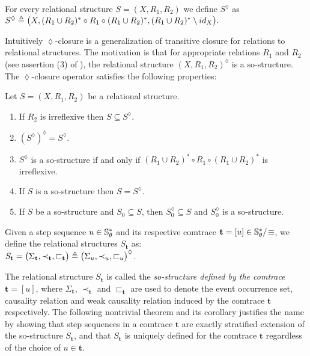 \documentclass{llncs}
\begin{document}
\begin{definition}[\cite{JK95}]
For every relational structure $S=(X,R_1,R_2)$ we define $S^\lozenge$ as\smallskip\\
\mbox{\hspace{2cm}}$S^\lozenge \triangleq \bigl(X,(R_1\cup R_2)^* \circ R_1 \circ (R_1\cup R_2)^*,(R_1\cup R_2)^* \setminus id_X\bigr).$ \EOD
\label{def:SO-CL}
\end{definition}


Intuitively $\lozenge$-closure is a generalization of transitive closure for relations to relational structures. The motivation is that for appropriate  relations $R_1$ and $R_2$ (see assertion (3) of ), the relational structure $(X,R_1,R_2)^\lozenge$ is a so-structure. The $\lozenge$-closure operator satisfies the following properties:

\begin{proposition}[\cite{JK95}]
Let $S=(X,R_1,R_2)$ be a relational structure.
\begin{enumerate}
\item If $R_2$ is irreflexive then $S\subseteq S^\lozenge$.
\item $(S^\lozenge)^\lozenge = S^\lozenge$.
\item $S^\lozenge$ is a so-structure if and only if 
$(R_1\cup R_2)^* \circ R_1 \circ (R_1\cup R_2)^*$
is irreflexive.
\item If $S$ is a so-structure then $S=S^\lozenge$.
\item If $S$ be a so-structure and $S_0 \subseteq S$, then $S_0^{\lozenge}\subseteq S$ and $S_0^{\lozenge}$ is a so-structure. \hspace{-5mm}
\END
\end{enumerate}
\label{prop:so-cl}
\end{proposition}


\begin{definition}
Given a step sequence  $u\in \mathbb{S}_{\theta}^*$ and its respective comtrace $\mathbf{t}=[u]\in \mathbb{S}_{\theta}^*/\!\equiv$, we define the relational structures $S_{\mathbf{t}}$ as: \\
\mbox{\hspace{3.5cm}}$\displaystyle S_{\mathbf{t}}  = \bigl( \Sigma_{\mathbf{t}}, \prec_{\mathbf{t}} ,\sqsubset_{\mathbf{t}} \bigr)\triangleq \bigl( \Sigma_{u}, \prec_u ,\sqsubset_u \bigr)^\lozenge$.\EOD
\label{def:s2sos}
\end{definition}

The relational structure $S_{\mathbf{t}}$ is called the \emph{so-structure defined by the comtrace} $\mathbf{t}=[u]$, where $\Sigma_{\mathbf{t}}$, $\prec_{\mathbf{t}}$  and $\sqsubset_{\mathbf{t}}$ are used to denote the event occurrence set, causality relation and weak causality relation induced by the comtrace $\mathbf{t}$ respectively.  The following nontrivial theorem and its corollary justifies the name by showing that  step sequences in a comtrace $\mathbf{t}$ are exactly stratified extension of the so-structure $S_\mathbf{t}$, and that $S_{\mathbf{t}}$ is uniquely defined for the comtrace $\mathbf{t}$ regardless of the choice of $u\in \mathbf{t}$. 
\end{document}

